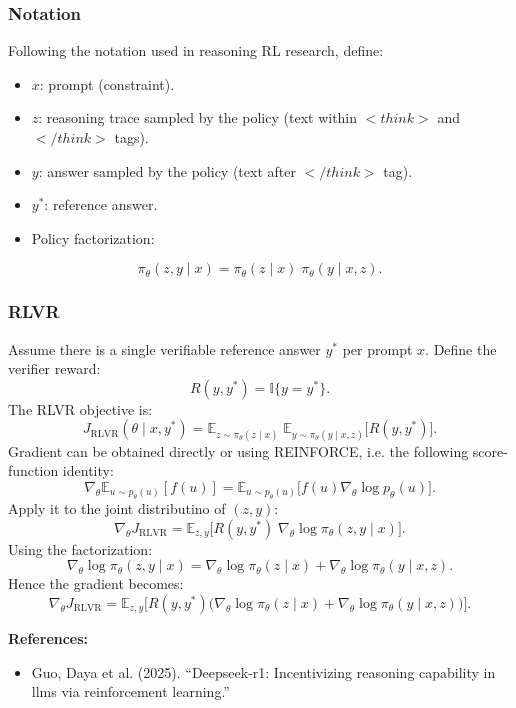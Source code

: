 \documentclass[12pt]{extarticle}
\begin{document}
\subsubsection{Notation}
Following the notation used in reasoning RL research, define:
\begin{itemize}[leftmargin=1.5em]
  \item \(x\): prompt (constraint).
  \item \(z\): reasoning trace sampled by the policy (text within \( <think> \) and \( </think> \) tags).
  \item \(y\): answer sampled by the policy (text after \( </think> \) tag).
  \item \(y^{*}\): reference answer.
  \item Policy factorization:
\end{itemize}
\[
  \pi_\theta(z,y\mid x)=\pi_\theta(z\mid x)\;\pi_\theta(y\mid x,z).
\]

\subsubsection{RLVR}
Assume there is a single verifiable reference answer \(y^{*}\) per prompt \(x\). Define the verifier reward:
\[
  R(y,y^{*})=\mathbb{I}\{y=y^{*}\}.
\]
The RLVR objective is:
\[
  J_{\text{RLVR}}(\theta\mid x,y^{*})=\mathbb{E}_{z\sim\pi_\theta(z\mid x)}\;\mathbb{E}_{y\sim\pi_\theta(y\mid x,z)}\big[R(y,y^{*})\big].
\]
Gradient can be obtained directly or using REINFORCE, i.e. the following score-function identity:
\[
  \nabla_\theta \mathbb{E}_{u\sim p_\theta(u)}[f(u)] = \mathbb{E}_{u\sim p_\theta(u)}\big[f(u)\nabla_\theta \log p_\theta(u)\big].
\]
Apply it to the joint distributino of \((z,y)\):
\[
  \nabla_\theta J_{\text{RLVR}}
  =\mathbb{E}_{z,y}\Big[R(y,y^{*})\;\nabla_\theta\log \pi_\theta(z,y\mid x)\Big].
\]
Using the factorization:
\[
  \nabla_\theta\log \pi_\theta(z,y\mid x)=\nabla_\theta\log \pi_\theta(z\mid x)+\nabla_\theta\log \pi_\theta(y\mid x,z).
\]
Hence the gradient becomes:
\[
  \nabla_\theta J_{\text{RLVR}}
  =\mathbb{E}_{z,y}\Big[R(y,y^{*})\big(\nabla_\theta\log \pi_\theta(z\mid x)+\nabla_\theta\log \pi_\theta(y\mid x,z)\big)\Big].
\]

\textbf{References:}
\begin{itemize}[leftmargin=1.5em]
  \item Guo, Daya et al. (2025). ``Deepseek-r1: Incentivizing reasoning capability in llms via reinforcement learning.''
\end{itemize}
\end{document}
